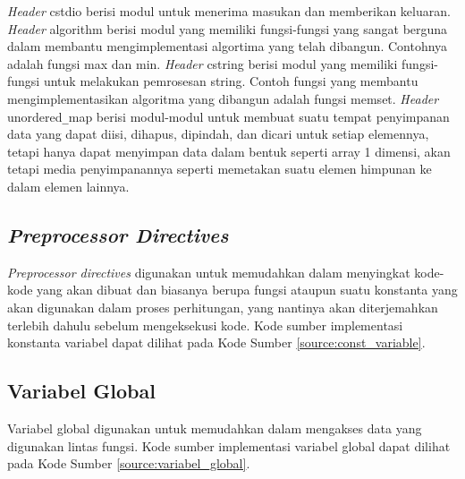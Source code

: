 

\textit{Header} {\selectfont cstdio} berisi modul untuk menerima masukan dan memberikan keluaran. \textit{Header} {\selectfont algorithm} berisi modul yang memiliki fungsi-fungsi yang sangat berguna dalam membantu mengimplementasi algortima yang telah dibangun. Contohnya adalah fungsi {\selectfont max} dan {\selectfont min}. \textit{Header} {\selectfont cstring }berisi modul yang memiliki fungsi-fungsi untuk melakukan pemrosesan {\selectfont string}. Contoh fungsi yang membantu mengimplementasikan algoritma yang dibangun adalah fungsi {\selectfont memset}. \textit{Header} {\selectfont unordered\verb|_|map} berisi modul-modul untuk membuat suatu tempat penyimpanan data yang dapat diisi, dihapus, dipindah, dan dicari untuk setiap elemennya, tetapi hanya dapat menyimpan data dalam bentuk seperti array 1 dimensi, akan tetapi media penyimpanannya seperti memetakan suatu elemen himpunan ke dalam elemen lainnya. 

\subsection{\textit{Preprocessor Directives}}
\textit{Preprocessor directives} digunakan untuk memudahkan dalam menyingkat kode-kode yang akan dibuat dan biasanya berupa fungsi ataupun suatu konstanta yang akan digunakan dalam proses perhitungan, yang nantinya akan diterjemahkan terlebih dahulu sebelum mengeksekusi kode. Kode sumber implementasi konstanta variabel dapat dilihat pada Kode Sumber \ref{source:const_variable}.

\begin{minipage}{\linewidth}

\end{minipage}

\subsection{Variabel Global}
Variabel global digunakan untuk memudahkan dalam mengakses data yang digunakan lintas fungsi. Kode sumber implementasi variabel global dapat dilihat pada Kode Sumber \ref{source:variabel_global}.


